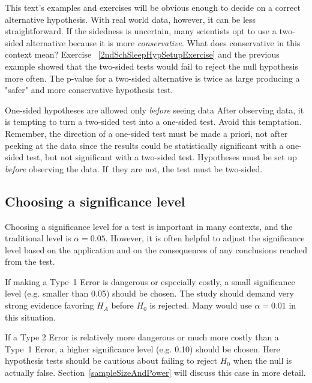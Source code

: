 This text's examples and exercises will be obvious enough to decide on a correct alternative hypothesis. With real world data, however, it can be less straightforward. If the sidedness is uncertain, many scientists opt to use a two-sided alternative because it is more \emph{conservative}. What does conservative in this context mean? Exercise ~\ref{2ndSchSleepHypSetupExercise} and the previous example showed that the two-sided tests would fail to reject the null hypothesis more often. The p-value for a two-sided alternative is twice as large producing a "safer" and more conservative hypothesis test. 

\begin{caution}{One-sided hypotheses are allowed only \emph{before} seeing data}
{After observing data, it is tempting to turn a two-sided test into a one-sided test. Avoid this temptation. Remember, the direction of a one-sided test must be made a priori, not after peeking at the data since the results could be statistically significant with a one-sided test, but not significant with a two-sided test. Hypotheses must be set up \emph{before} observing the data. If~they are not, the test must be two-sided.}
\end{caution}


\subsection{Choosing a significance level}
\label{significanceLevel}


Choosing a significance level for a test is important in many contexts, and the traditional level is $\alpha=0.05$. However, it is often helpful to adjust the significance level based on the application and on the consequences of any conclusions reached from the test.

If making a Type~1 Error is dangerous or especially costly, a small significance level (e.g. smaller than 0.05) should be chosen. The study should demand very strong evidence favoring $H_A$ before $H_0$ is rejected. Many would use $\alpha=0.01$ in this situation. 

If a Type 2 Error is relatively more dangerous or much more costly than a Type~1 Error, a higher significance level (e.g. 0.10) should be chosen. Here hypothesis tests should be cautious about failing to reject $H_0$ when the null is actually false.  Section~\ref{sampleSizeAndPower} will discuss this case in more detail.

